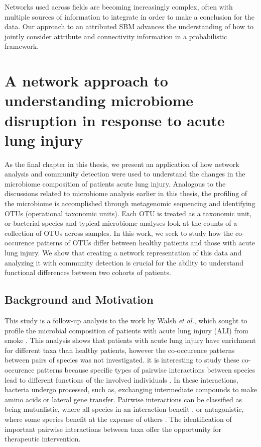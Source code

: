 Networks used across fields are becoming increasingly complex, often with multiple sources of information to integrate in order to make a conclusion for the data. Our approach to an attributed SBM advances the understanding of how to jointly consider attribute and connectivity information in a probabilistic framework.  

\chapter{A network approach to understanding microbiome disruption in response to acute lung injury}
\indent As the final chapter in this thesis, we present an application of how network analysis and community detection were used to understand the changes in the microbiome composition of patients acute lung injury. Analogous to the discussions related to microbiome analysis earlier in this thesis, the profiling of the microbiome is accomplished through metagenomic sequencing and identifying OTUs (operational taxonomic units). Each OTU is treated as a taxonomic unit, or bacterial species and typical microbiome analyses look at the counts of a collection of OTUs across samples. In this work, we seek to study how the co-occurence patterns of OTUs differ between healthy patients and those with acute lung injury. We show that creating a network representation of this data and analyzing it with community detection is crucial for the ability to understand functional differences between two cohorts of patients.

\section{Background and Motivation}
 This study is a follow-up analysis to the work by Walsh \emph{et al.}, which sought to profile the microbial composition of patients with acute lung injury (ALI) from smoke \cite{walsh2017}. This analysis shows that patients with acute lung injury have enrichment for different taxa than healthy patients, however the co-occurence patterns between pairs of species was not investigated. it is interesting to study these co-occurence patterns because specific types of pairwise interactions between species lead to different functions of the involved individuals \cite{boon}.  In these interactions, bacteria undergo processed, such as, exchanging intermediate compounds to make amino acids or lateral gene transfer. Pairwise interactions can be classified as being mutualistic, where all species in an interaction benefit , or antagonistic, where some species benefit at the expense of others \cite{mutualism}. The identification of important pairwise interactions between taxa offer the opportunity for therapeutic intervention.  
 
